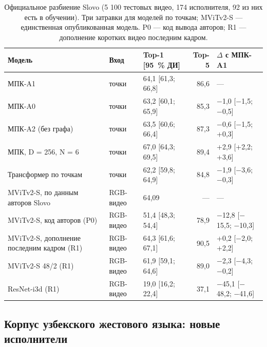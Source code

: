 \documentclass[a4paper,fleqn]{cas-dc}
\begin{document}
\begin{table}[t]
\caption{Официальное разбиение Slovo (5 100 тестовых видео, 174 исполнителя, 92 из них есть в обучении). Три затравки для моделей по точкам; MViTv2-S — единственная опубликованная модель. P0 — код вывода авторов; R1 — дополнение коротких видео последним кадром.}\label{tab:official}
\footnotesize
\centering
\begin{tabular}{lllrl}
\toprule
\textbf{Модель} & \textbf{Вход} & \textbf{Top-1 [95~\% ДИ]} & \textbf{Top-5} & \textbf{$\Delta$ с МПК-A1} \\
\midrule
МПК-A1 & точки & 64,1 [61,3; 66,8] & 86,6 & --- \\
МПК-A0 & точки & 63,2 [60,1; 65,9] & 85,3 & $-$1,0 [$-$1,5; $-$0,5] \\
МПК-A2 (без графа) & точки & 63,5 [60,6; 66,4] & 87,3 & $-$0,6 [$-$1,5; +0,3] \\
МПК, D = 256, N = 6 & точки & 67,0 [64,3; 69,5] & 89,4 & +2,9 [+2,2; +3,6] \\
Трансформер по точкам & точки & 62,2 [59,8; 64,9] & 84,8 & $-$1,9 [$-$3,6; $-$0,3] \\
MViTv2-S, по данным авторов Slovo & RGB-видео & 64,09 & --- & --- \\
MViTv2-S, код авторов (P0) & RGB-видео & 51,4 [48,3; 54,4] & 78,9 & $-$12,8 [$-$15,5; $-$10,3] \\
MViTv2-S, дополнение последним кадром (R1) & RGB-видео & 64,3 [61,6; 67,1] & 90,5 & +0,2 [$-$2,0; +2,2] \\
MViTv2-S 48/2 (R1) & RGB-видео & 61,9 [59,1; 64,6] & 89,0 & $-$2,3 [$-$4,3; $-$0,2] \\
ResNet-i3d (R1) & RGB-видео & 19,0 [16,2; 22,4] & 37,1 & $-$45,1 [$-$48,2; $-$41,6] \\
\bottomrule
\end{tabular}
\end{table}

\hypertarget{ux43aux43eux440ux43fux443ux441-ux443ux437ux431ux435ux43aux441ux43aux43eux433ux43e-ux436ux435ux441ux442ux43eux432ux43eux433ux43e-ux44fux437ux44bux43aux430-ux43dux43eux432ux44bux435-ux438ux441ux43fux43eux43bux43dux438ux442ux435ux43bux438}{%
\subsection{Корпус узбекского жестового языка: новые исполнители}\label{ux43aux43eux440ux43fux443ux441-ux443ux437ux431ux435ux43aux441ux43aux43eux433ux43e-ux436ux435ux441ux442ux43eux432ux43eux433ux43e-ux44fux437ux44bux43aux430-ux43dux43eux432ux44bux435-ux438ux441ux43fux43eux43bux43dux438ux442ux435ux43bux438}}
\end{document}
